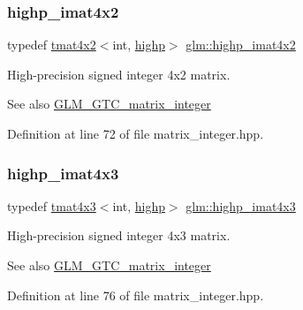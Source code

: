 \subsubsection{\texorpdfstring{highp\_imat4x2}{highp\_imat4x2}}
{\footnotesize\ttfamily typedef \mbox{\hyperlink{structglm_1_1tmat4x2}{tmat4x2}}$<$int, \mbox{\hyperlink{namespaceglm_a0f04f086094c747d227af4425893f545ac6f7eab42eacbb10d59a58e95e362074}{highp}}$>$ \mbox{\hyperlink{group__gtc__matrix__integer_ga7b936ac315e12b546d2597a4bffee4a1}{glm\+::highp\+\_\+imat4x2}}}

High-\/precision signed integer 4x2 matrix. \begin{DoxySeeAlso}{See also}
\mbox{\hyperlink{group__gtc__matrix__integer}{G\+L\+M\+\_\+\+G\+T\+C\+\_\+matrix\+\_\+integer}} 
\end{DoxySeeAlso}


Definition at line 72 of file matrix\+\_\+integer.\+hpp.

\mbox{\label{group__gtc__matrix__integer_ga28e21d3fe05d8476402e27081150cade}} 
\subsubsection{\texorpdfstring{highp\_imat4x3}{highp\_imat4x3}}
{\footnotesize\ttfamily typedef \mbox{\hyperlink{structglm_1_1tmat4x3}{tmat4x3}}$<$int, \mbox{\hyperlink{namespaceglm_a0f04f086094c747d227af4425893f545ac6f7eab42eacbb10d59a58e95e362074}{highp}}$>$ \mbox{\hyperlink{group__gtc__matrix__integer_ga28e21d3fe05d8476402e27081150cade}{glm\+::highp\+\_\+imat4x3}}}

High-\/precision signed integer 4x3 matrix. \begin{DoxySeeAlso}{See also}
\mbox{\hyperlink{group__gtc__matrix__integer}{G\+L\+M\+\_\+\+G\+T\+C\+\_\+matrix\+\_\+integer}} 
\end{DoxySeeAlso}


Definition at line 76 of file matrix\+\_\+integer.\+hpp.

\mbox{\label{group__gtc__matrix__integer_ga2a80b8ab686297145ecf713699233114}} 
